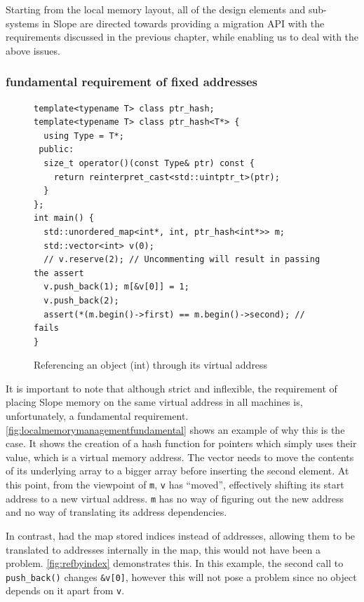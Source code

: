 Starting from the local memory layout, all of the design elements and
sub-systems in Slope are directed towards providing a migration API with the
requirements discussed in the previous chapter, while enabling us to deal with
the above
issues.


\subsubsection{fundamental requirement of fixed addresses}
\label{sec:fixedfundamental}
\begin{figure}[tp]
\begin{lstlisting}
template<typename T> class ptr_hash;
template<typename T> class ptr_hash<T*> {
  using Type = T*;
 public:
  size_t operator()(const Type& ptr) const {
    return reinterpret_cast<std::uintptr_t>(ptr);
  }
};
int main() {
  std::unordered_map<int*, int, ptr_hash<int*>> m;
  std::vector<int> v(0);
  // v.reserve(2); // Uncommenting will result in passing the assert
  v.push_back(1); m[&v[0]] = 1;
  v.push_back(2);
  assert(*(m.begin()->first) == m.begin()->second); // fails
}
\end{lstlisting}
\caption{
    Referencing an object (int) through its virtual address
}
\label{fig:localmemorymanagementfundamental}
\end{figure}
It is important to note that although strict and inflexible, the requirement of
placing Slope memory on the same virtual address in all machines is,
unfortunately, a fundamental requirement. \autoref{fig:localmemorymanagementfundamental}
shows an example of why this is the case. It shows the creation of a hash
    function for pointers which simply uses their value, which is a virtual
    memory address. The vector needs to move the contents of its underlying
    array to a bigger array before inserting the second element. At this point, from the viewpoint of
    \texttt{m}, \texttt{v} has ``moved'', effectively shifting its start
    address to a new virtual address. \texttt{m} has no way of figuring out
    the new address and no way of translating its address dependencies.

In contrast, had the map stored indices instead of addresses, allowing them
to be translated to addresses internally in the map, this would not have been
a problem. \autoref{fig:refbyindex} demonstrates this. In this example,
the second call to \texttt{push\_back()} changes \texttt{\&v[0]}, however this
will not pose a problem since no object depends on it apart from \texttt{v}.

